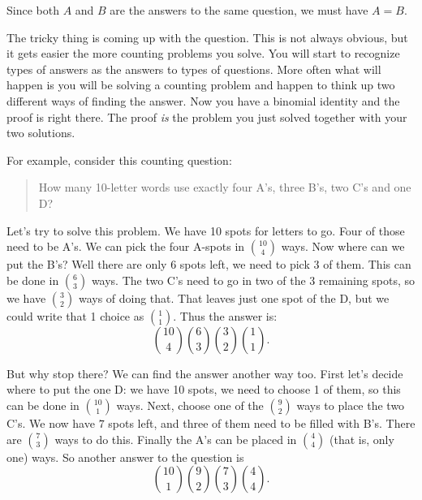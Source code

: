 \documentclass[10pt,]{book}
\theoremstyle{plain}
\theoremstyle{definition}
\theoremstyle{definition}
\theoremstyle{definition}
\numberwithin{equation}{chapter}
\begin{document}
      Since both \(A\) and \(B\) are the answers to the same question, we must have \(A = B\).
\par

      The tricky thing is coming up with the question. This is not always obvious, but it gets easier the more counting problems you solve. You will start to recognize types of answers as the answers to types of questions. More often what will happen is you will be solving a counting problem and happen to think up two different ways of finding the answer. Now you have a binomial identity and the proof is right there. The proof \emph{is} the problem you just solved together with your two solutions.
\par

      For example, consider this counting question:

      \begin{quote}
        How many 10-letter words use exactly four A's, three B's, two C's and one D?
      \end{quote}


      Let's try to solve this problem. We have 10 spots for letters to go. Four of those need to be A's. We can pick the four A-spots in \({10 \choose 4}\) ways. Now where can we put the B's? Well there are only 6 spots left, we need to pick \(3\) of them. This can be done in \({6 \choose 3}\) ways. The two C's need to go in two of the 3 remaining spots, so we have \({3 \choose 2}\) ways of doing that. That leaves just one spot of the D, but we could write that 1 choice as \({1 \choose 1}\). Thus the answer is:
      \begin{equation*}
        {10 \choose 4}{6 \choose 3}{3 \choose 2}{1 \choose 1}.
      \end{equation*}
\par

      But why stop there? We can find the answer another way too. First let's decide where to put the one D: we have 10 spots, we need to choose 1 of them, so this can be done in \({10 \choose 1}\) ways. Next, choose one of the \({9 \choose 2}\) ways to place the two C's. We now have \(7\) spots left, and three of them need to be filled with B's. There are \({7 \choose 3}\) ways to do this. Finally the A's can be placed in \({4 \choose 4}\) (that is, only one) ways. So another answer to the question is
      \begin{equation*}
        {10 \choose 1}{9 \choose 2}{7 \choose 3}{4 \choose 4}.
      \end{equation*}
\par
\end{document}
